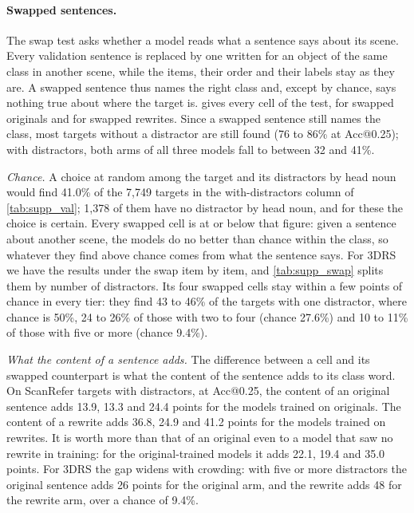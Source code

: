 \paragraph{Swapped sentences.}
The swap test asks whether a model reads what a sentence says about its scene.
Every validation sentence is replaced by one written for an object of the same class in another scene, while the items, their order and their labels stay as they are.
A swapped sentence thus names the right class and, except by chance, says nothing true about where the target is.
 gives every cell of the test, for swapped originals and for swapped rewrites.
Since a swapped sentence still names the class, most targets without a distractor are still found (76 to 86\% at Acc@0.25); with distractors, both arms of all three models fall to between 32 and 41\%.

\emph{Chance.}
A choice at random among the target and its distractors by head noun would find 41.0\% of the 7,749 targets in the with-distractors column of \cref{tab:supp_val}; 1,378 of them have no distractor by head noun, and for these the choice is certain.
Every swapped cell is at or below that figure: given a sentence about another scene, the models do no better than chance within the class, so whatever they find above chance comes from what the sentence says.
For 3DRS we have the results under the swap item by item, and \cref{tab:supp_swap} splits them by number of distractors.
Its four swapped cells stay within a few points of chance in every tier: they find 43 to 46\% of the targets with one distractor, where chance is 50\%, 24 to 26\% of those with two to four (chance 27.6\%) and 10 to 11\% of those with five or more (chance 9.4\%).

\emph{What the content of a sentence adds.}
The difference between a cell and its swapped counterpart is what the content of the sentence adds to its class word.
On ScanRefer targets with distractors, at Acc@0.25, the content of an original sentence adds 13.9, 13.3 and 24.4 points for the models trained on originals.
The content of a rewrite adds 36.8, 24.9 and 41.2 points for the models trained on rewrites.
It is worth more than that of an original even to a model that saw no rewrite in training: for the original-trained models it adds 22.1, 19.4 and 35.0 points.
For 3DRS the gap widens with crowding: with five or more distractors the original sentence adds 26 points for the original arm, and the rewrite adds 48 for the rewrite arm, over a chance of 9.4\%.

